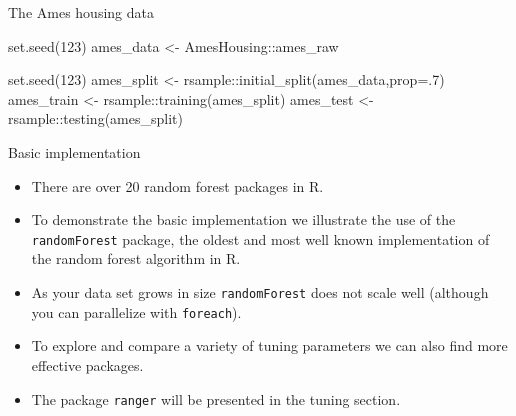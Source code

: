 \documentclass[
  10pt,
  ignorenonframetext,
]{beamer}
\newenvironment{Shaded}{}{}
\newcommand{\DataTypeTok}[1]{#1}
\newcommand{\DecValTok}[1]{#1}
\newcommand{\KeywordTok}[1]{\textcolor[rgb]{0.00,0.00,1.00}{#1}}
\newcommand{\NormalTok}[1]{#1}
\newcommand{\OperatorTok}[1]{#1}
\newcommand{\StringTok}[1]{\textcolor[rgb]{0.00,0.50,0.50}{#1}}
\providecommand{\tightlist}{%
  \setlength{\itemsep}{0pt}\setlength{\parskip}{0pt}}
\begin{document}
\begin{frame}[fragile]{The Ames housing data}
\protect\hypertarget{the-ames-housing-data}{}

\begin{Shaded}
\begin{Highlighting}[]
\KeywordTok{set.seed}\NormalTok{(}\DecValTok{123}\NormalTok{)}
\NormalTok{ames_data <-}\StringTok{ }\NormalTok{AmesHousing}\OperatorTok{::}\NormalTok{ames_raw}
\end{Highlighting}
\end{Shaded}

\begin{Shaded}
\begin{Highlighting}[]
\KeywordTok{set.seed}\NormalTok{(}\DecValTok{123}\NormalTok{)}
\NormalTok{ames_split <-}\StringTok{ }\NormalTok{rsample}\OperatorTok{::}\KeywordTok{initial_split}\NormalTok{(ames_data,}\DataTypeTok{prop=}\NormalTok{.}\DecValTok{7}\NormalTok{)}
\NormalTok{ames_train <-}\StringTok{ }\NormalTok{rsample}\OperatorTok{::}\KeywordTok{training}\NormalTok{(ames_split)}
\NormalTok{ames_test  <-}\StringTok{ }\NormalTok{rsample}\OperatorTok{::}\KeywordTok{testing}\NormalTok{(ames_split)}
\end{Highlighting}
\end{Shaded}

\end{frame}

\begin{frame}[fragile]{Basic implementation}
\protect\hypertarget{basic-implementation}{}

\begin{itemize}
\tightlist
\item
  There are over 20 random forest packages in R.
\item
  To demonstrate the basic implementation we illustrate the use of the
  \texttt{randomForest} package, the oldest and most well known
  implementation of the random forest algorithm in R.
\item
  As your data set grows in size \texttt{randomForest} does not scale
  well (although you can parallelize with \texttt{foreach}).
\item
  To explore and compare a variety of tuning parameters we can also find
  more effective packages.
\item
  The package \texttt{ranger} will be presented in the tuning section.
\end{itemize}

\end{frame}
\end{document}
